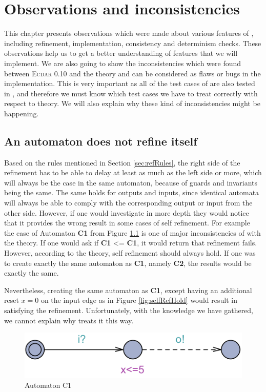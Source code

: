 \chapter{Observations and  inconsistencies}\label{ch:inconst}

This chapter presents observations which were made about various features of \ecdar, including refinement, implementation, consistency and determinism checks. These observations help us to get a better understanding of features that we will implement. We are also going to show the inconsistencies which were found between \textsc{Ecdar} 0.10 and the theory and can be considered as flaws or bugs in the implementation. This is very important as all of the test cases of \jecdar are also tested in , and therefore we must know which test cases we have to treat correctly with respect to theory. We will also explain why these kind of inconsistencies might be happening.

\section{An automaton does not refine itself}\label{sec:selfRef}
Based on the rules mentioned in Section \ref{sec:refRules}, the right side of the refinement has to be able to delay at least as much as the left side or more, which will always be the case in the same automaton, because of guards and invariants being the same. The same holds for outputs and inputs, since identical automata will always be able to comply with the corresponding output or input from the other side. However, if one would investigate  in more depth they would notice that it provides the wrong result in some cases of self refinement. For example the case of Automaton \textbf{C1} from Figure \ref{fig:selfRefinementFail} is one of major inconsistencies of  with the theory. If one would ask  if \textbf{C1} <= \textbf{C1}, it would return that refinement fails. However, according to the theory, self refinement should always hold. If one was to create exactly the same automaton as \textbf{C1}, namely \textbf{C2}, the results would be exactly the same.

Nevertheless, creating the same automaton as \textbf{C1}, except having an additional reset $x=0$ on the input edge as in Figure \ref{fig:selfRefHold} would result in satisfying the refinement. Unfortunately, with the knowledge we have gathered, we cannot explain why  treats it this way.
\begin{figure}
    \centering
    \includegraphics[scale = 0.7]{figures/selfRefFail.png}
    \caption{Automaton C1}
    \label{fig:selfRefinementFail}
\end{figure}

